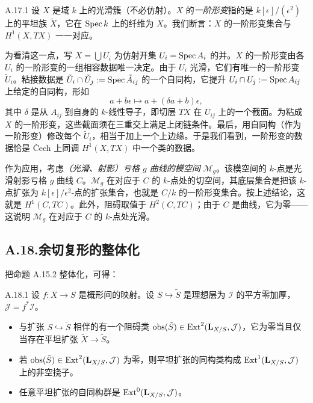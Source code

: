 \begin{exam}{A.17.1}\label{thm:a6-08-10}
设 $X$ 是域 $k$ 上的光滑簇（不必仿射）。$X$ 的\emph{一阶形变}指的是 $k[\epsilon]/(\epsilon^2)$ 上的平坦族 $\tilde X$，它在 $\operatorname{Spec} k$ 上的纤维为 $X$。我们断言：$X$ 的一阶形变集合与 $H^1(X,TX)$ 一一对应。

为看清这一点，写 $X=\bigcup U_i$ 为仿射开集 $U_i=\operatorname{Spec} A_i$ 的并。$X$ 的一阶形变由各 $U_i$ 的一阶形变的一组相容数据唯一决定。由于 $U_i$ 光滑，它们有唯一的一阶形变 $\tilde U_i$。粘接数据是 $\tilde U_i\cap\tilde U_j:=\operatorname{Spec}\tilde A_{ij}$ 的一个自同构，它提升 $U_i\cap U_j:=\operatorname{Spec} A_{ij}$ 上给定的自同构，形如
\[
a+b\epsilon\mapsto a+(\delta a+b)\epsilon,
\]
其中 $\delta$ 是从 $A_{ij}$ 到自身的 $k$-线性导子，即切层 $TX$ 在 $U_{ij}$ 上的一个截面。为粘成 $X$ 的一阶形变，这些截面须在三重交上满足上闭链条件。最后，用自同构（作为一阶形变）修改每个 $\tilde U_i$，相当于加上一个上边缘。于是我们看到，一阶形变的数据恰是 Čech 上同调 $H^1(X,TX)$ 中一个类的数据。

作为应用，考虑\emph{（光滑、射影）亏格 $g$ 曲线的模空间} $\mathcal M_g$。该模空间的 $k$-点是光滑射影亏格 $g$ 曲线 $C$。$\mathcal M_g$ 在对应于 $C$ 的 $k$-点处的切空间，其底层集合是把该 $k$-点扩张为 $k[\epsilon]/\epsilon^2$-点的扩张集合，也就是 $C/k$ 的一阶形变集合。按上述结论，这就是 $H^1(C,TC)$。此外，阻碍取值于 $H^2(C,TC)$；由于 $C$ 是曲线，它为零——这说明 $\mathcal M_g$ 在对应于 $C$ 的 $k$-点处光滑。
\end{exam}

\subsection*{A.18.\quad 余切复形的整体化}

把命题 A.15.2 整体化，可得：

\begin{prop}{A.18.1}\label{thm:a6-08-11}
设 $f\colon X\to S$ 是概形间的映射。设 $S\hookrightarrow\tilde S$ 是理想层为 $\mathcal I$ 的平方零加厚，$\mathcal J=f^*\mathcal I$。
\begin{itemize}
\item 与扩张 $S\hookrightarrow\tilde S$ 相伴的有一个阻碍类 $\mathrm{obs}(\tilde S)\in\operatorname{Ext}^2(\mathbf L_{X/S},\mathcal J)$，它为零当且仅当存在平坦扩张 $\tilde X\to\tilde S$。
\item 若 $\mathrm{obs}(\tilde S)\in\operatorname{Ext}^2(\mathbf L_{X/S},\mathcal J)$ 为零，则平坦扩张的同构类构成 $\operatorname{Ext}^1(\mathbf L_{X/S},\mathcal J)$ 上的非空挠子。
\item 任意平坦扩张的自同构群是 $\operatorname{Ext}^0(\mathbf L_{X/S},\mathcal J)$。
\end{itemize}
\end{prop}

